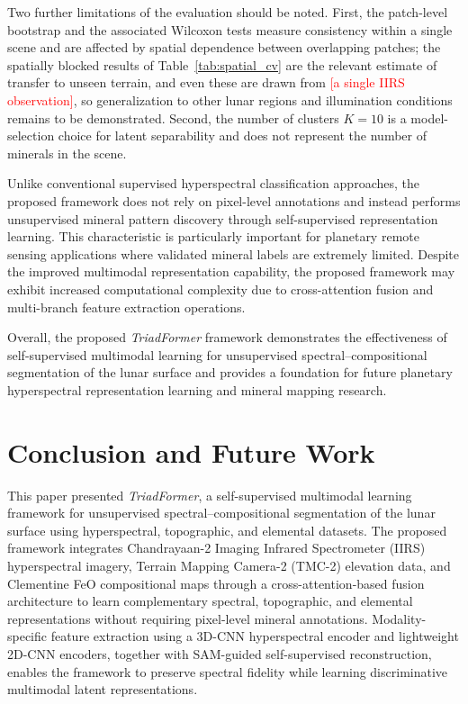 \documentclass[pdflatex,sn-mathphys-num]{sn-jnl}
\newcommand{\fillin}[1]{\textcolor{red}{[#1]}}
\begin{document}
Two further limitations of the evaluation should be noted. First, the patch-level bootstrap and the associated Wilcoxon tests measure consistency within a single scene and are affected by spatial dependence between overlapping patches; the spatially blocked results of Table~\ref{tab:spatial_cv} are the relevant estimate of transfer to unseen terrain, and even these are drawn from \fillin{a single IIRS observation}, so generalization to other lunar regions and illumination conditions remains to be demonstrated. Second, the number of clusters $K=10$ is a model-selection choice for latent separability and does not represent the number of minerals in the scene.

Unlike conventional supervised hyperspectral classification approaches, the proposed framework does not rely on pixel-level annotations and instead performs unsupervised mineral pattern discovery through self-supervised representation learning. This characteristic is particularly important for planetary remote sensing applications where validated mineral labels are extremely limited. Despite the improved multimodal representation capability, the proposed framework may exhibit increased computational complexity due to cross-attention fusion and multi-branch feature extraction operations.

Overall, the proposed \textit{TriadFormer} framework demonstrates the effectiveness of self-supervised multimodal learning for unsupervised spectral--compositional segmentation of the lunar surface and provides a foundation for future planetary hyperspectral representation learning and mineral mapping research.

\section{Conclusion and Future Work}

This paper presented \textit{TriadFormer}, a self-supervised multimodal learning framework for unsupervised spectral--compositional segmentation of the lunar surface using hyperspectral, topographic, and elemental datasets. The proposed framework integrates Chandrayaan-2 Imaging Infrared Spectrometer (IIRS) hyperspectral imagery, Terrain Mapping Camera-2 (TMC-2) elevation data, and Clementine FeO compositional maps through a cross-attention-based fusion architecture to learn complementary spectral, topographic, and elemental representations without requiring pixel-level mineral annotations. Modality-specific feature extraction using a 3D-CNN hyperspectral encoder and lightweight 2D-CNN encoders, together with SAM-guided self-supervised reconstruction, enables the framework to preserve spectral fidelity while learning discriminative multimodal latent representations.
\end{document}
